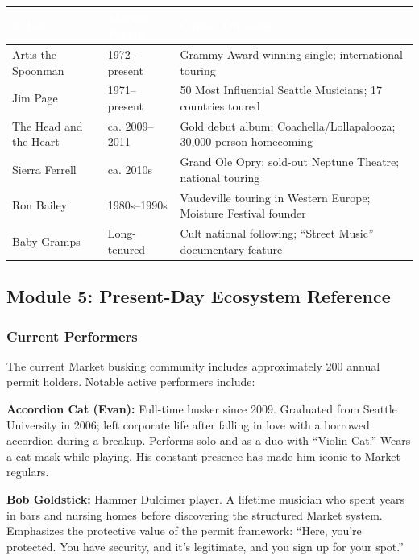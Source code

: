 \documentclass[11pt,letterpaper]{article}
\newcommand{\tableheader}[1]{\textbf{\sffamily\textcolor{white}{#1}}}
\begin{document}
\begin{center}
\begin{tabularx}{\textwidth}{L{3cm}L{3cm}X}
\toprule
{}
\tableheader{Artist} & \tableheader{Market Period} & \tableheader{Career Outcome} \\
\midrule
Artis the Spoonman & 1972--present & Grammy Award-winning single; international touring \\
Jim Page & 1971--present & 50 Most Influential Seattle Musicians; 17 countries toured \\
The Head and the Heart & ca. 2009--2011 & Gold debut album; Coachella/Lollapalooza; 30,000-person homecoming \\
Sierra Ferrell & ca. 2010s & Grand Ole Opry; sold-out Neptune Theatre; national touring \\
Ron Bailey & 1980s--1990s & Vaudeville touring in Western Europe; Moisture Festival founder \\
Baby Gramps & Long-tenured & Cult national following; ``Street Music'' documentary feature \\
\bottomrule
\end{tabularx}
\end{center}

\subsection{Module 5: Present-Day Ecosystem Reference}

\subsubsection{Current Performers}

The current Market busking community includes approximately 200 annual permit holders. Notable active performers include:

\textbf{Accordion Cat (Evan):} Full-time busker since 2009. Graduated from Seattle University in 2006; left corporate life after falling in love with a borrowed accordion during a breakup. Performs solo and as a duo with ``Violin Cat.'' Wears a cat mask while playing. His constant presence has made him iconic to Market regulars.

\textbf{Bob Goldstick:} Hammer Dulcimer player. A lifetime musician who spent years in bars and nursing homes before discovering the structured Market system. Emphasizes the protective value of the permit framework: ``Here, you're protected. You have security, and it's legitimate, and you sign up for your spot.''
\end{document}
